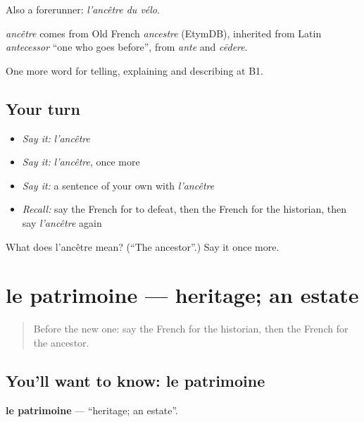 Also a forerunner: \emph{l'ancêtre du vélo}.

\begin{cousinweb}
\emph{ancêtre} comes from Old French \emph{ancestre} (EtymDB), inherited from Latin \emph{antecessor} \textquotedblleft{}one who goes before\textquotedblright{}, from \emph{ante} and \emph{cēdere}.
\end{cousinweb}

\begin{grammarlens}[title={What you've built}]
One more word for telling, explaining and describing at B1.
\end{grammarlens}

\subsection*{Your turn}
\begin{itemize}
\raggedright
  \item \emph{Say it:} \emph{l'ancêtre}
  \item \emph{Say it:} \emph{l'ancêtre}, once more
  \item \emph{Say it:} a sentence of your own with \emph{l'ancêtre}
  \item \emph{Recall:} say the French for to defeat, then the French for the historian, then say \emph{l'ancêtre} again
\end{itemize}

\begin{tcolorbox}[breakable,colback=teal!4,colframe=teal!35!black,title={Before you move on}]
What does l'ancêtre mean? (\textquotedblleft{}The ancestor\textquotedblright{}.) Say it once more.
\end{tcolorbox}
\section[le patrimoine]{le patrimoine — heritage; an estate}

\label{lesson:FR-C325-patrimoine}



\begin{quote}
Before the new one: say the French for the historian, then the French for the ancestor.
\end{quote}

\subsection*{You'll want to know: le patrimoine}
\textbf{le patrimoine} — \textquotedblleft{}heritage; an estate\textquotedblright{}.

